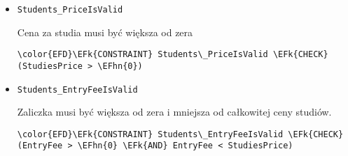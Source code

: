 \documentclass[11pt]{article}
\newcommand{\EFk}[1]{\textcolor{EFk}{\textbf{#1}}} %
\newcommand{\EFhn}[1]{\textcolor{EFhn}{#1}} %
\begin{document}
\begin{itemize}
\item \texttt{Students\_PriceIsValid}

Cena za studia musi być większa od zera
\begin{Code}
\begin{Verbatim}
\color{EFD}\EFk{CONSTRAINT} Students\_PriceIsValid \EFk{CHECK}
(StudiesPrice > \EFhn{0})
\end{Verbatim}
\end{Code}
\item \texttt{Students\_EntryFeeIsValid}

Zaliczka musi być większa od zera i mniejsza od całkowitej ceny studiów.
\begin{Code}
\begin{Verbatim}
\color{EFD}\EFk{CONSTRAINT} Students\_EntryFeeIsValid \EFk{CHECK}
(EntryFee > \EFhn{0} \EFk{AND} EntryFee < StudiesPrice)
\end{Verbatim}
\end{Code}
\end{itemize}
\end{document}
